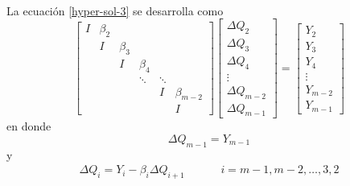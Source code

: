 \documentclass[letterpaper, openright, 12pt]{book}
\begin{document}
    \paragraph*{}
        La ecuación \ref{hyper-sol-3} se desarrolla como
        \begin{equation}
            \begin{bmatrix}
                I & \beta_2\\
                & I & \beta_3\\
                & & I & \beta_4\\
                & & & \ddots & \ddots\\
                & & & & I & \beta_{m-2}\\
                & & & & & I
            \end{bmatrix}
            \begin{bmatrix}
                \Delta Q_2\\
                \Delta Q_3\\
                \Delta Q_4\\
                \vdots\\
                \Delta Q_{m-2}\\
                \Delta Q_{m-1}
            \end{bmatrix}
            =
            \begin{bmatrix}
                Y_2\\
                Y_3\\
                Y_4\\
                \vdots\\
                Y_{m-2}\\
                Y_{m-1}
            \end{bmatrix}
        \end{equation}
        en donde
        \begin{equation}
            \Delta Q_{m-1} = Y_{m-1}
        \end{equation}
        y
        \begin{align}
            \Delta Q_i = Y_i - \beta_i \Delta Q_{i+1} &&&& i = m-1, m-2, \dots, 3, 2
        \end{align}\\
%
%
%
%
%


%
%
%
%
%
%
%
%
\cleardoublepage
{} %
% 

% 

\end{document}
